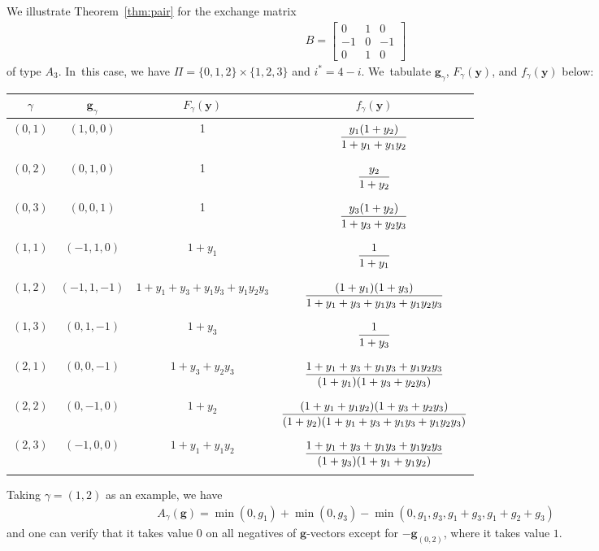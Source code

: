 \documentclass[pdftex]{sigma}%
\def\y{{\mathbf y}}
\def\g{{\mathbf g}}
\numberwithin{equation}{section}
\begin{document}
\begin{Example}\label{ex:A3}
We illustrate Theorem~\ref{thm:pair} for the exchange matrix
\begin{gather*}
B = \begin{bmatrix}
0 & 1 & 0 \\
-1 & 0 & -1 \\
0 & 1 & 0
\end{bmatrix}
\end{gather*}
of type $A_3$. In~this case, we have $\Pi = \{0,1,2\} \times \{1,2,3\}$ and $i^* = 4-i$. We~tabulate $\g_\gamma$, $F_\gamma(\y)$, and $f_\gamma(\y)$ below:
\begin{center}
\setlength{\tabcolsep}{4.0pt}
\renewcommand{\arraystretch}{1.2}
\begin{tabular}{c|c|c|c}
\hline
$\gamma$ & $\g_\gamma$ & $F_\gamma(\y)$ &$f_\gamma(\y)$\\
\hline
$(0,1)$ & $(1,0,0)$ & 1 & $\dfrac{y_1(1+y_2)}{1+y_1+y_1y_2} \vphantom{\Bigg(}$\\
\hline
$(0,2)$ & $(0,1,0)$ & 1 & $\dfrac{y_2}{1+y_2}\vphantom{\Bigg(} $\\
\hline
$(0,3)$ & $(0,0,1)$ & 1 & $\dfrac{y_3(1+y_2)}{1+y_3+y_2y_3}\vphantom{\Bigg(} $\\
\hline
$(1,1)$ & $(-1,1,0)$ & $1+y_1$ & $\dfrac{1}{1+y_1} \vphantom{\Bigg(}$\\
\hline
$(1,2)$ & $(-1,1,-1)$ & $1+y_1+y_3+y_1y_3+y_1y_2y_3$ &$ \dfrac{(1+y_1)(1+y_3)}{1+y_1+y_3+y_1y_3+y_1y_2y_3}\vphantom{\Bigg(} $\\
\hline
$(1,3)$ & $(0,1,-1)$ & $1+y_3$ & $ \dfrac{1}{1+y_3}\vphantom{\Bigg(}$\\
\hline
$(2,1)$ & $(0,0,-1)$ & $1+y_3+y_2y_3$ & $\dfrac{1+y_1+y_3+y_1y_3+y_1y_2y_3}{(1+y_1)(1+y_3+y_2y_3)}\vphantom{\Bigg(}$ \\
\hline
$(2,2)$ & $(0,-1,0)$ & $1+y_2$ & $\dfrac{(1+y_1+y_1y_2)(1+y_3+y_2y_3)}{(1+y_2)(1+y_1+y_3+y_1y_3+y_1y_2y_3)}\vphantom{\Bigg(}$\\
\hline
$(2,3)$ & $(-1,0,0)$ & $1+y_1+y_1y_2$ & $\dfrac{1+y_1+y_3+y_1y_3+y_1y_2y_3}{(1+y_3)(1+y_1+y_1y_2)}\vphantom{\Bigg(}$\\
\hline
\end{tabular}
\end{center}

\noindent
Taking $\gamma = (1,2)$ as an example, we have
\begin{gather*}
A_\gamma(\g) = \min(0,g_1)+\min(0,g_3) - \min(0,g_1,g_3,g_1+g_3,g_1+g_2+g_3)
\end{gather*}
and one can verify that it takes value 0 on all negatives of $\g$-vectors except for $-\g_{(0,2)}$, where it takes value $1$.
\end{Example}
\end{document}
